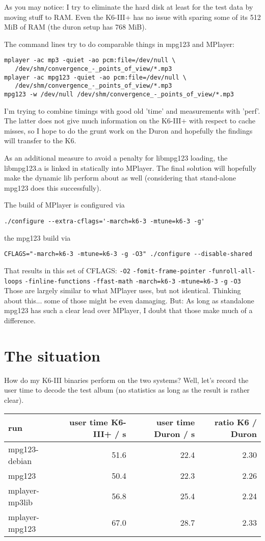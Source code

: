\documentclass[a4paper,12pt]{scrartcl}
\begin{document}
As you may notice: I try to eliminate the hard disk at least for the test data by moving stuff to RAM. Even the K6-III+ has no issue with sparing some of its 512 MiB of RAM (the duron setup has 768 MiB).

The command lines try to do comparable things in mpg123 and MPlayer:

\begin{verbatim}
mplayer -ac mp3 -quiet -ao pcm:file=/dev/null \
   /dev/shm/convergence_-_points_of_view/*.mp3
mplayer -ac mpg123 -quiet -ao pcm:file=/dev/null \
   /dev/shm/convergence_-_points_of_view/*.mp3
mpg123 -w /dev/null /dev/shm/convergence_-_points_of_view/*.mp3
\end{verbatim}

I'm trying to combine timings with good old 'time' and measurements with 'perf'. The latter does not give much information on the K6-III+ with respect to cache misses, so I hope to do the grunt work on the Duron and hopefully the findings will transfer to the K6.

As an additional measure to avoid a penalty for libmpg123 loading, the libmpg123.a is linked in statically into MPlayer. The final solution will hopefully make the dynamic lib perform about as well (considering that stand-alone mpg123 does this successfully).

The build of MPlayer is configured via
\begin{verbatim}
./configure --extra-cflags='-march=k6-3 -mtune=k6-3 -g'
\end{verbatim}
the mpg123 build via
\begin{verbatim}
CFLAGS="-march=k6-3 -mtune=k6-3 -g -O3" ./configure --disable-shared
\end{verbatim}

That results in this set of CFLAGS: \verb:-O2: \verb:-fomit-frame-pointer: \verb:-funroll-all-loops: \verb:-finline-functions: \verb:-ffast-math:  \verb:-march=k6-3: \verb:-mtune=k6-3: \verb:-g: \verb:-O3:
Those are largely similar to what MPlayer uses, but not identical. Thinking about this... some of those might be even damaging. But: As long as standalone mpg123 has such a clear lead over MPlayer, I doubt that those make much of a difference.


\section{The situation}

How do my K6-III binaries perform on the two systems? Well, let's record the user time to decode the test album (no statistics as long as the result is rather clear).
\begin{center}
\begin{tabular}{lrrr}
run & user time K6-III+ / s & user time Duron / s & ratio K6 / Duron \\
\hline
mpg123-debian & 51.6 & 22.4 & 2.30 \\
mpg123 & 50.4 & 22.3 & 2.26 \\
mplayer-mp3lib & 56.8 & 25.4 & 2.24 \\
mplayer-mpg123 & 67.0 & 28.7 & 2.33
\end{tabular}
\end{center}
\end{document}
